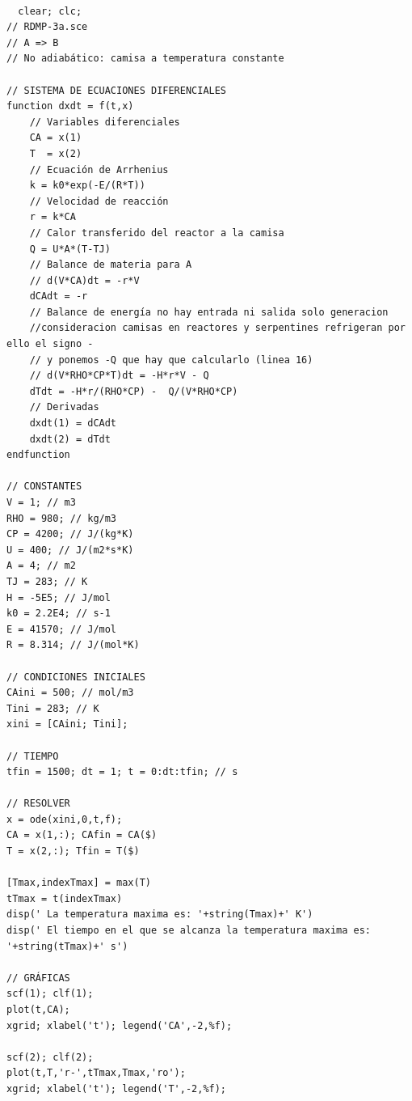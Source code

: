 \begin{verbatim}

  clear; clc; 
// RDMP-3a.sce
// A => B
// No adiabático: camisa a temperatura constante

// SISTEMA DE ECUACIONES DIFERENCIALES
function dxdt = f(t,x)
    // Variables diferenciales
    CA = x(1)
    T  = x(2)
    // Ecuación de Arrhenius
    k = k0*exp(-E/(R*T))
    // Velocidad de reacción
    r = k*CA
    // Calor transferido del reactor a la camisa
    Q = U*A*(T-TJ)
    // Balance de materia para A
    // d(V*CA)dt = -r*V
    dCAdt = -r                             
    // Balance de energía no hay entrada ni salida solo generacion 
    //consideracion camisas en reactores y serpentines refrigeran por ello el signo -
    // y ponemos -Q que hay que calcularlo (linea 16)
    // d(V*RHO*CP*T)dt = -H*r*V - Q
    dTdt = -H*r/(RHO*CP) -  Q/(V*RHO*CP)   
    // Derivadas
    dxdt(1) = dCAdt
    dxdt(2) = dTdt
endfunction

// CONSTANTES
V = 1; // m3
RHO = 980; // kg/m3
CP = 4200; // J/(kg*K)
U = 400; // J/(m2*s*K)
A = 4; // m2
TJ = 283; // K
H = -5E5; // J/mol
k0 = 2.2E4; // s-1
E = 41570; // J/mol
R = 8.314; // J/(mol*K)

// CONDICIONES INICIALES
CAini = 500; // mol/m3
Tini = 283; // K
xini = [CAini; Tini];

// TIEMPO
tfin = 1500; dt = 1; t = 0:dt:tfin; // s

// RESOLVER
x = ode(xini,0,t,f);
CA = x(1,:); CAfin = CA($)
T = x(2,:); Tfin = T($)

[Tmax,indexTmax] = max(T)
tTmax = t(indexTmax)
disp(' La temperatura maxima es: '+string(Tmax)+' K')
disp(' El tiempo en el que se alcanza la temperatura maxima es: '+string(tTmax)+' s')

// GRÁFICAS
scf(1); clf(1); 
plot(t,CA);
xgrid; xlabel('t'); legend('CA',-2,%f);

scf(2); clf(2); 
plot(t,T,'r-',tTmax,Tmax,'ro');
xgrid; xlabel('t'); legend('T',-2,%f);
\end{verbatim}


